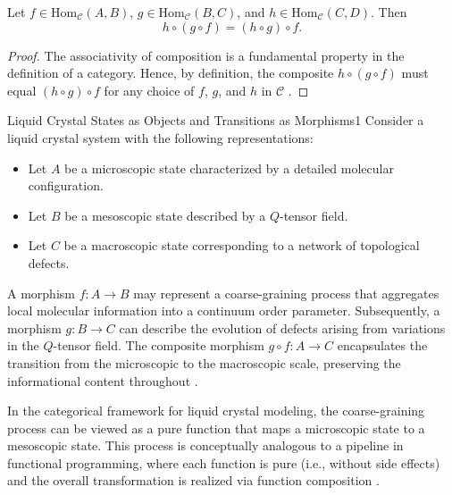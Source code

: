 \begin{theorem}
	Let \(f \in \mathrm{Hom}_{\mathcal{C}}(A,B)\), \(g \in \mathrm{Hom}_{\mathcal{C}}(B,C)\), and \(h \in \mathrm{Hom}_{\mathcal{C}}(C,D)\). Then
	\[
	h\circ (g\circ f) = (h\circ g)\circ f.
	\]
\end{theorem}

\begin{proof}
	The associativity of composition is a fundamental property in the definition of a category. Hence, by definition, the composite \(h\circ (g\circ f)\) must equal \((h\circ g)\circ f\) for any choice of \(f\), \(g\), and \(h\) in \(\mathcal{C}\) \cite{maclane1971categories}.
\end{proof}

\begin{example}{Liquid Crystal States as Objects and Transitions as Morphisms}{1} 
	Consider a liquid crystal system with the following representations:
	\begin{itemize}
		\item Let \(A\) be a microscopic state characterized by a detailed molecular configuration.
		\item Let \(B\) be a mesoscopic state described by a \(Q\)-tensor field.
		\item Let \(C\) be a macroscopic state corresponding to a network of topological defects.
	\end{itemize}
	A morphism \(f: A \to B\) may represent a coarse-graining process that aggregates local molecular information into a continuum order parameter. Subsequently, a morphism \(g: B \to C\) can describe the evolution of defects arising from variations in the \(Q\)-tensor field. The composite morphism \(g\circ f: A \to C\) encapsulates the transition from the microscopic to the macroscopic scale, preserving the informational content throughout \cite{degennes1993physics, cardy1996scaling}.
\end{example}

In the categorical framework for liquid crystal modeling, the coarse-graining process can be viewed as a pure function that maps a microscopic state to a mesoscopic state. This process is conceptually analogous to a pipeline in functional programming, where each function is pure (i.e., without side effects) and the overall transformation is realized via function composition \cite{spivak2014category}.

